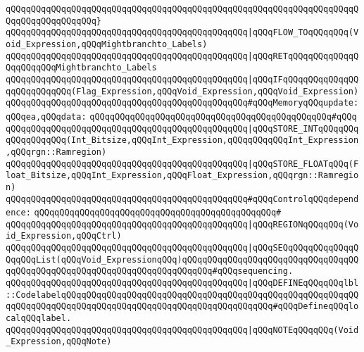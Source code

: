 \verb|qQQqqQQqqQQqqQQqqQQqqQQqqQQqqQQqqQQqqQQqqQQqqQQqqQQqqQQqqQQqqQQqqQQqqQQqqQQqqQQqqQQqqQQq}|\newline
\newline
\verb|qQQqqQQqqQQqqQQqqQQqqQQqqQQqqQQqqQQqqQQqqQQqqQQq|\verb#|qQQqFLOW_TOqQQqqQQq(Void_Expression,qQQqMightbranchto_Labels)#\newline
\verb|qQQqqQQqqQQqqQQqqQQqqQQqqQQqqQQqqQQqqQQqqQQqqQQq|\verb#|qQQqRETqQQqqQQqqQQqqQQqqQQqqQQqMightbranchto_Labels#\newline
\verb|qQQqqQQqqQQqqQQqqQQqqQQqqQQqqQQqqQQqqQQqqQQqqQQq|\verb#|qQQqIFqQQqqQQqqQQqqQQqqQQqqQQqqQQq(Flag_Expression,qQQqVoid_Expression,qQQqVoid_Expression)#\newline
\newline
\verb|qQQqqQQqqQQqqQQqqQQqqQQqqQQqqQQqqQQqqQQqqQQqqQQq#qQQqMemoryqQQqupdate:qQQqea,qQQqdata:|\newline
\verb|qQQqqQQqqQQqqQQqqQQqqQQqqQQqqQQqqQQqqQQqqQQqqQQq#qQQq|\newline
\verb|qQQqqQQqqQQqqQQqqQQqqQQqqQQqqQQqqQQqqQQqqQQqqQQq|\verb#|qQQqSTORE_INTqQQqqQQqqQQqqQQqqQQq(Int_Bitsize,qQQqInt_Expression,qQQqqQQqqQQqInt_Expression,qQQqrgn::Ramregion)#\newline
\verb|qQQqqQQqqQQqqQQqqQQqqQQqqQQqqQQqqQQqqQQqqQQqqQQq|\verb#|qQQqSTORE_FLOATqQQq(Float_Bitsize,qQQqInt_Expression,qQQqFloat_Expression,qQQqrgn::Ramregion)#\newline
\newline
\verb|qQQqqQQqqQQqqQQqqQQqqQQqqQQqqQQqqQQqqQQqqQQqqQQq#qQQqControlqQQqdependence:|\newline
\verb|qQQqqQQqqQQqqQQqqQQqqQQqqQQqqQQqqQQqqQQqqQQqqQQq#|\newline
\verb|qQQqqQQqqQQqqQQqqQQqqQQqqQQqqQQqqQQqqQQqqQQqqQQq|\verb#|qQQqREGIONqQQqqQQq(Void_Expression,qQQqCtrl)#\newline
\newline
\verb|qQQqqQQqqQQqqQQqqQQqqQQqqQQqqQQqqQQqqQQqqQQqqQQq|\verb#|qQQqSEQqQQqqQQqqQQqqQQqqQQqList(qQQqVoid_ExpressionqQQq)qQQqqQQqqQQqqQQqqQQqqQQqqQQqqQQqqQQqqQQqqQQqqQQqqQQqqQQqqQQqqQQqqQQqqQQqqQQq#\verb|#qQQqsequencing.|\newline
\verb|qQQqqQQqqQQqqQQqqQQqqQQqqQQqqQQqqQQqqQQqqQQqqQQq|\verb#|qQQqDEFINEqQQqqQQqlbl::CodelabelqQQqqQQqqQQqqQQqqQQqqQQqqQQqqQQqqQQqqQQqqQQqqQQqqQQqqQQqqQQqqQQqqQQqqQQqqQQqqQQqqQQqqQQqqQQqqQQqqQQqqQQqqQQqqQQq#\verb|#qQQqDefineqQQqlocalqQQqlabel.|\newline
\newline
\verb|qQQqqQQqqQQqqQQqqQQqqQQqqQQqqQQqqQQqqQQqqQQqqQQq|\verb#|qQQqNOTEqQQqqQQq(Void_Expression,qQQqNote)#\newline
